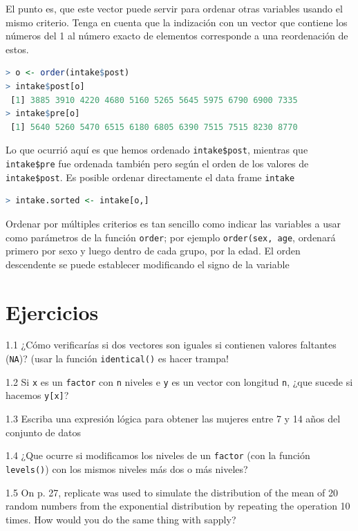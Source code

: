 \documentclass[spanish]{extbook}
\numberwithin{equation}{section}
\numberwithin{figure}{section}
\begin{document}
El punto es, que este vector puede servir para ordenar otras variables usando
el mismo criterio. Tenga en cuenta que la indización con un vector que contiene
los números del 1 al número exacto de elementos corresponde a una reordenación
de estos.

\begin{lstlisting}[language=R]
> o <- order(intake$post)
> intake$post[o]
 [1] 3885 3910 4220 4680 5160 5265 5645 5975 6790 6900 7335
> intake$pre[o]
 [1] 5640 5260 5470 6515 6180 6805 6390 7515 7515 8230 8770
\end{lstlisting}


Lo que ocurrió aquí es que hemos ordenado \texttt{intake\$post}, mientras que
\texttt{intake\$pre} fue ordenada también pero según el orden de los valores de
\texttt{intake\$post}. Es posible ordenar directamente el data frame
\texttt{intake}

\begin{lstlisting}[language=R]
> intake.sorted <- intake[o,]
\end{lstlisting}

Ordenar por múltiples criterios es tan sencillo como indicar las variables a
usar como parámetros de la función \texttt{order}; por ejemplo
\texttt{order(sex, age}, ordenará primero por sexo y luego dentro de cada
grupo, por la edad. El orden descendente se puede establecer modificando el
signo de la variable

\section{Ejercicios}

1.1 ¿Cómo verificarías si dos vectores son iguales si contienen valores
faltantes (\texttt{NA})? (usar la función \texttt{identical()} es hacer
trampa!

1.2 Si \texttt{x} es un \texttt{factor} con \texttt{n} niveles e \texttt{y} es
un vector con longitud \texttt{n}, ¿que sucede si hacemos \texttt{y[x]}?

1.3 Escriba una expresión lógica para obtener las mujeres entre 7 y 14 años del
conjunto de datos 

1.4 ¿Que ocurre si modificamos los niveles de un \texttt{factor} (con la
función \texttt{levels()}) con los mismos niveles más dos o más niveles?

1.5 On p. 27, replicate was used to simulate the distribution of the
mean of 20 random numbers from the exponential distribution by repeating the operation 10 times. How would you do the same thing with
sapply?
\end{document}
